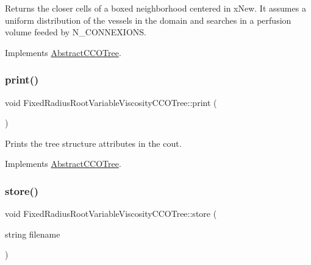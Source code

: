 Returns the closer cells of a boxed neighborhood centered in x\+New. It assumes a uniform distribution of the vessels in the domain and searches in a perfusion volume feeded by N\+\_\+\+C\+O\+N\+N\+E\+X\+I\+O\+NS. 

Implements \mbox{\hyperlink{class_abstract_c_c_o_tree}{Abstract\+C\+C\+O\+Tree}}.

\mbox{\label{class_fixed_radius_root_variable_viscosity_c_c_o_tree_ace906f79ed34249637de23e3da9a6d7d}} 
\subsubsection{\texorpdfstring{print()}{print()}}
{\footnotesize\ttfamily void Fixed\+Radius\+Root\+Variable\+Viscosity\+C\+C\+O\+Tree\+::print (\begin{DoxyParamCaption}{ }\end{DoxyParamCaption})\hspace{0.3cm}{\ttfamily [virtual]}}

Prints the tree structure attributes in the cout. 

Implements \mbox{\hyperlink{class_abstract_c_c_o_tree}{Abstract\+C\+C\+O\+Tree}}.

\mbox{\label{class_fixed_radius_root_variable_viscosity_c_c_o_tree_a344bd0496ff1c71c7f4289e598ad6760}} 
\subsubsection{\texorpdfstring{store()}{store()}}
{\footnotesize\ttfamily void Fixed\+Radius\+Root\+Variable\+Viscosity\+C\+C\+O\+Tree\+::store (\begin{DoxyParamCaption}\item[{string}]{filename }\end{DoxyParamCaption})\hspace{0.3cm}{\ttfamily [virtual]}}

